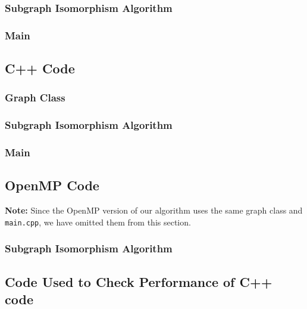 \documentclass{article}
\begin{document}
    \subsubsection{Subgraph Isomorphism Algorithm}
      
    \subsubsection{Main}
      

  \subsection{C++ Code}
    \subsubsection{Graph Class}
      
    \subsubsection{Subgraph Isomorphism Algorithm}
      
    \subsubsection{Main}
      

  \subsection{OpenMP Code}
    \textbf{Note:} Since the OpenMP version of our algorithm uses the same graph class and \texttt{main.cpp}, we have omitted them from this section.

    \subsubsection{Subgraph Isomorphism Algorithm}
      

  \subsection{Code Used to Check Performance of C++ code}
    

  \printbibliography[heading=bibintoc,
                     title={References}]
\end{document}
